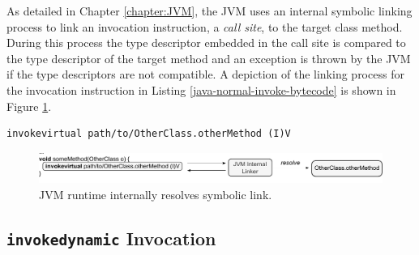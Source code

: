 As detailed in Chapter \ref{chapter:JVM}, the JVM uses an internal symbolic linking process to link an invocation instruction, a \emph{call site}, to the target class method.  During this process the type descriptor embedded in the call site is compared to the type descriptor of the target method and an exception is thrown by the JVM if the type descriptors are not compatible.  A depiction of the linking process for the invocation instruction in Listing \ref{java-normal-invoke-bytecode} is shown in Figure \ref{fig:linking-invokevirtual}.
\vspace{2em}
\begin{lstlisting}[language=jvm-bytecode,caption=virtual method invocation bytecode,label=java-normal-invoke-bytecode]
invokevirtual path/to/OtherClass.otherMethod (I)V
\end{lstlisting}
\vspace{2em}
\begin{figure}[htbp]
	\centering
		\includegraphics[width=\textwidth]{./Figures/linking-invokevirtual.pdf}
	\caption[invokevirtual Linking]{JVM runtime internally resolves symbolic link.}
	\label{fig:linking-invokevirtual}
\end{figure}

\subsection{\texttt{invokedynamic} Invocation}

